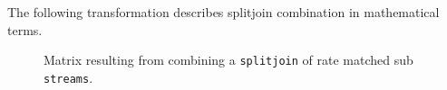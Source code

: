 The following transformation describes splitjoin combination in
mathematical terms.


\begin{figure}
\center
\epsfxsize=3.0in
\caption{Matrix resulting from combining a {\tt splitjoin} of rate matched sub {\tt streams}.
\protect\label{fig:splitjoin-duplicate-matrix}}
\vspace{-12pt}
\end{figure}

